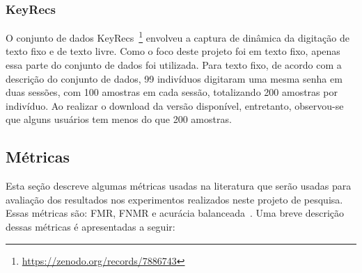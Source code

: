 \subsubsection{KeyRecs}\label{subsubsec:keyrecs}

O conjunto de dados KeyRecs~\footnote{\url{https://zenodo.org/records/7886743}} envolveu a captura de dinâmica da digitação de texto fixo e de texto livre. Como o foco deste projeto foi em texto fixo, apenas essa parte do conjunto de dados foi utilizada. Para texto fixo, de acordo com a descrição do conjunto de dados, 99 indivíduos digitaram uma mesma senha em duas sessões, com 100 amostras em cada sessão, totalizando 200 amostras por indivíduo. Ao realizar o download da versão disponível, entretanto, observou-se que alguns usuários tem menos do que 200 amostras.


\subsection{Métricas}\label{sec:metricas}

Esta seção descreve algumas métricas usadas na literatura que serão usadas para avaliação dos resultados nos experimentos realizados neste projeto de pesquisa. Essas métricas são: FMR, FNMR e acurácia balanceada~\cite{Precise2014, Ferlini2021eargate}. Uma breve descrição dessas métricas é apresentadas a seguir:

